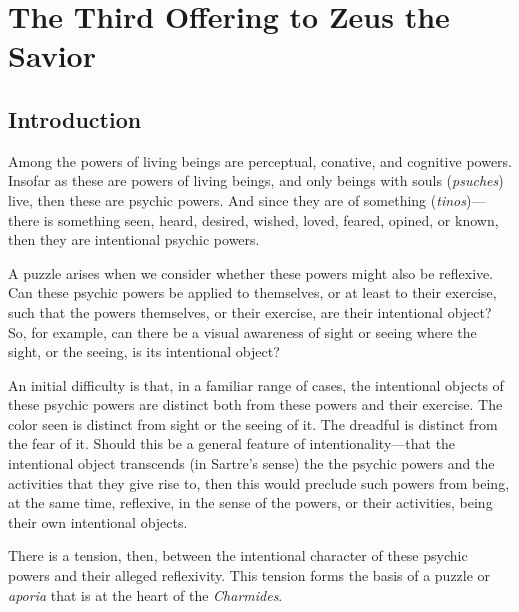 \chapter{The Third Offering to Zeus the Savior} %
\label{cha:offering}

\section{Introduction} %
\label{sec:introduction}

Among the powers of living beings are perceptual, conative, and cognitive powers. Insofar as these are powers of living beings, and only beings with souls (\emph{psuches}) live, then these are psychic powers. And since they are of something (\emph{tinos})—there is something seen, heard, desired, wished, loved, feared, opined, or known, then they are intentional psychic powers.

A puzzle arises when we consider whether these powers might also be reflexive. Can these psychic powers be applied to themselves, or at least to their exercise, such that the powers themselves, or their exercise, are their intentional object? So, for example, can there be a visual awareness of sight or seeing where the sight, or the seeing, is its intentional object?

An initial difficulty is that, in a familiar range of cases, the intentional objects of these psychic powers are distinct both from these powers and their exercise. The color seen is distinct from sight or the seeing of it. The dreadful is distinct from the fear of it. Should this be a general feature of intentionality—that the intentional object transcends (in Sartre's sense) the the psychic powers and the activities that they give rise to, then this would preclude such powers from being, at the same time, reflexive, in the sense of the powers, or their activities, being their own intentional objects.

There is a tension, then, between the intentional character of these psychic powers and their alleged reflexivity. This tension forms the basis of a puzzle or \emph{aporia} that is at the heart of the \emph{Charmides}.



